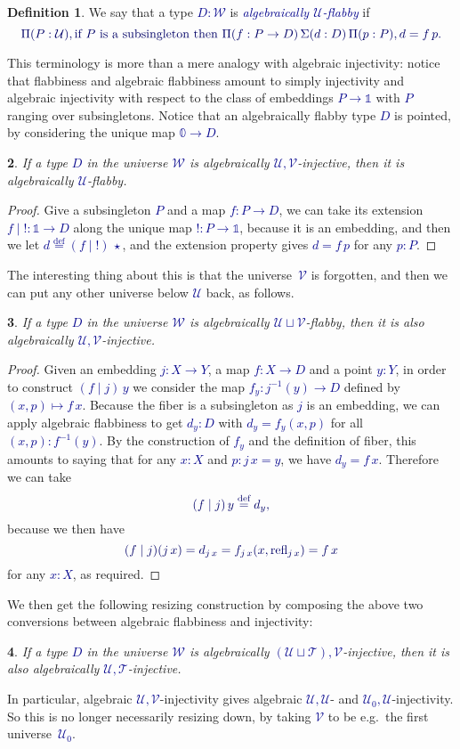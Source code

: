 \documentclass[10pt]{article}
\newcommand{\db}{\textcolor{darkblue}}
\newcommand{\df}[1]{\emph{\db{#1}}}
\newcommand{\m}[1]{\db{$#1$}}
\newcommand{\M}[1]{\[\db{#1}\]}
\newcommand{\U}{\mathcal{U}}
\newcommand{\V}{\mathcal{V}}
\newcommand{\W}{\mathcal{W}}
\newcommand{\T}{\mathcal{T}}
\newcommand{\Zero}{\mathbb{0}}
\newcommand{\One}{\mathbb{1}}
\newcommand{\one}{\operatorname{\star}}
\newcommand{\refl}{\operatorname{refl}}
\newcommand{\eqdef}{\overset{\text{def}}{=}}
\newtheorem{numbered}{}
\theoremstyle{definition}
\newtheorem{definition}[numbered]{Definition}
\begin{document}
\begin{definition}
  We say that a type \m{D : \W} is \df{algebraically \m{\U}-flabby} if
%
\M{
  \Pi (P : \U), \text{if \m{P} is a subsingleton then \m{\Pi(f : P \to D)\, \Sigma (d : D)\, \Pi(p : P), d = f \, p}.}
}
%
\end{definition}
\noindent This terminology is more than a mere analogy with
algebraic injectivity: notice that flabbiness and algebraic flabbiness
amount to simply injectivity and algebraic injectivity with respect to
the class of embeddings \m{P \to \One} with \m{P} ranging over
subsingletons. Notice that an algebraically flabby type \m{D} is pointed, by considering the unique map \m{\Zero \to D}.

\begin{numbered}
  If a type \m{D} in the universe \m{\W} is algebraically
  \m{\U,\V}-injective, then it is algebraically \m{\U}-flabby.
\end{numbered}
\begin{proof}
  Give a subsingleton \m{P} and a map \m{f : P \to D}, we can take its extension \m{f \mid \operatorname{!}: \One \to D} along the unique map \m{!:P \to \One}, because it is an embedding, and then we let \m{d \eqdef (f \mid \operatorname{!})\, \one}, and the extension property gives \m{d = f \, p} for any \m{p:P}.
\end{proof}
The interesting thing about this is that the
universe~\m{\V} is forgotten, and then we can put any other universe
below \m{\U} back, as follows.

\begin{numbered}
  If a type \m{D} in the universe \m{\W} is algebraically \m{\U \sqcup
    \V}-flabby, then it is also algebraically \m{\U,\V}-injective.
\end{numbered}
\begin{proof}
  Given an embedding \m{j : X \to Y}, a map \m{f : X \to D} and a
  point \m{y:Y}, in order to construct \m{(f \mid j) \, y} we consider
  the map \m{f_y : j^{-1}(y) \to D} defined by \m{(x,p) \mapsto
    f\,x}. Because the fiber is a subsingleton as \m{j} is an
  embedding, we can apply algebraic flabbiness to get \m{d_y : D} with
  \m{d_y = f_y (x,p)} for all \m{(x,p):f^{-1}(y)}. By the construction of
  \m{f_y} and the definition of fiber, this amounts to saying that for
  any \m{x : X} and \m{p : j \, x = y}, we have \m{d_y = f \,
    x}. Therefore we can take
%
\M{(f \mid j) \, y \eqdef d_y,}
because we then have
%
\M{(f \mid j) (j \, x) = d_{j \, x} = f_{j \, x} (x , \refl_{j \, x}) = f \, x}
%
for any \m{x:X}, as required.
\end{proof}
\noindent We then get the following resizing construction by composing the above
two conversions between algebraic flabbiness and injectivity:
\begin{numbered}
  If a type \m{D} in the universe \m{\W} is algebraically \m{(\U \sqcup
    \T),\V}-injective, then it is also algebraically \m{\U,\T}-injective.
\end{numbered}
\noindent In particular, algebraic \m{\U,\V}-injectivity gives
algebraic \m{\U,\U}- and \m{\U_0,\U}-injectivity.  So this is no
longer necessarily resizing down, by taking \m{\V} to be
e.g.\ the first universe~\m{\U_0}.
\end{document}

